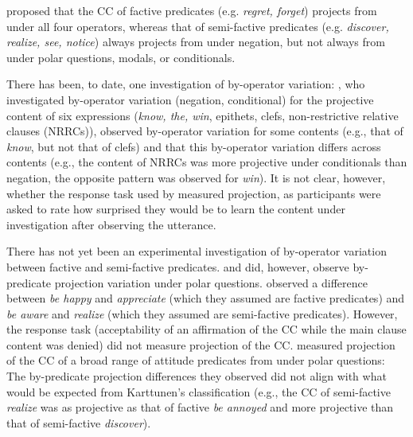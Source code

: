 \documentclass[12pt, a4paper]{article}
\begin{document}
	\vspace{-.4\baselineskip}
	\citet{karttunen_observations_1971} proposed that the CC of factive predicates (e.g. \emph{regret, forget}) projects from under all four operators, whereas that of semi-factive predicates (e.g. \emph{discover, realize, see, notice}) always projects from under negation, but not always from under polar questions, modals, or conditionals. 
	
	There has been, to date, one investigation of by-operator variation: \citealt{smith_relationship_2014}, who investigated by-operator variation (negation, conditional) for the projective content of six expressions (\emph{know, the, win}, epithets, clefs, non-restrictive relative clauses (NRRCs)), observed by-operator variation for some contents (e.g., that of \emph{know}, but not that of clefs) and that this by-operator variation differs across contents (e.g., the content of NRRCs was more projective under conditionals than negation, the opposite pattern was observed for \emph{win}). It is not clear, however, whether the response task used by \citealt{smith_relationship_2014} measured projection, as participants were asked to rate how surprised they would be to learn the content under investigation after observing the utterance.

	There has not yet been an experimental investigation of by-operator variation between factive and semi-factive predicates. \citealt{djarv_cognitive_2018} and \citealt{tonhauser_how_2018} did, however, observe by-predicate projection variation under polar questions. \citealt{djarv_cognitive_2018} observed a difference between \emph{be happy} and \emph{appreciate} (which they assumed are factive predicates) and \emph{be aware} and \emph{realize} (which they assumed are semi-factive predicates). However, the response task (acceptability of an affirmation of the CC while the main clause content was denied) did not measure projection of the CC. \citealt{tonhauser_how_2018} measured projection of the CC of a broad range of attitude predicates from under polar questions: The by-predicate projection differences they observed did not align with what would be expected from Karttunen's classification (e.g., the CC of semi-factive \emph{realize} was as projective as that of factive \emph{be annoyed} and more projective than that of semi-factive \emph{discover}).
\end{document}
